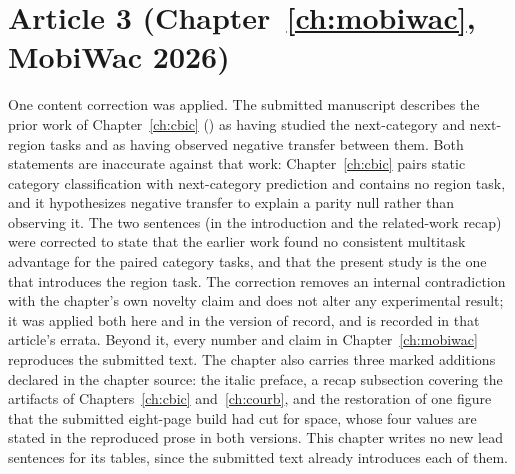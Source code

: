 \section{Article 3 (Chapter~\ref{ch:mobiwac}, MobiWac 2026)}
\label{apx:errata:mobiwac}

One content correction was applied. The submitted manuscript describes the prior work
of Chapter~\ref{ch:cbic} (\cite{silva2025mtlnet}) as having studied the next-category
and next-region tasks and as having observed negative transfer between them. Both
statements are inaccurate against that work: Chapter~\ref{ch:cbic} pairs static category
classification with next-category prediction and contains no region task, and it
hypothesizes negative transfer to explain a parity null rather than observing it. The
two sentences (in the introduction and the related-work recap) were corrected to state
that the earlier work found no consistent multitask advantage for the paired category
tasks, and that the present study is the one that introduces the region task. The
correction removes an internal contradiction with the chapter's own novelty claim and
does not alter any experimental result; it was applied both here and in the version of
record, and is recorded in that article's errata. Beyond it, every number and claim in
Chapter~\ref{ch:mobiwac} reproduces the submitted text. The chapter also carries three
marked additions declared in the chapter source: the italic preface, a recap subsection
covering the artifacts of Chapters~\ref{ch:cbic} and~\ref{ch:courb}, and the restoration
of one figure that the submitted eight-page build had cut for space, whose four values
are stated in the reproduced prose in both versions. This chapter writes no new lead
sentences for its tables, since the submitted text already introduces each of them.

